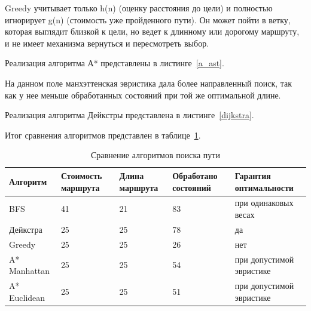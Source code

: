 



Greedy учитывает только h(n) (оценку расстояния до цели) и полностью игнорирует g(n) (стоимость уже пройденного пути). Он может пойти в ветку, которая выглядит близкой к цели, но ведет к длинному или дорогому маршруту, и не имеет механизма вернуться и пересмотреть выбор.


Реализация алгоритма А* представлены в листинге~\ref{a_ast}.





 На данном поле манхэттенская эвристика дала более направленный поиск, так как у нее меньше обработанных состояний при той же оптимальной длине.


Реализация алгоритма Дейкстры представлена в листинге~\ref{dijkstra}.



Итог сравнения алгоритмов представлен в таблице~\ref{compare}.

\begin{table}[!htbp]
	\caption{Сравнение алгоритмов поиска пути}
	\label{compare}
	\small
	\begin{tabularx}{\textwidth}{|X|X|X|X|X|}
		\hline
		\textbf{Алгоритм} & \textbf{Стоимость маршрута} & \textbf{Длина маршрута} & \textbf{Обработано состояний} & \textbf{Гарантия оптимальности} \\\hline
		BFS & 41 & 21 & 83 & при одинаковых весах\\\hline
		Дейкстра & 25 & 25 & 78 & да\\\hline
		Greedy & 25 & 25 & 26 & нет\\\hline
		A* Manhattan & 25 & 25 & 54 & при допустимой эвристике\\\hline
		A* Euclidean & 25 & 25 & 51 & при допустимой эвристике\\\hline	
	\end{tabularx}
\end{table}

